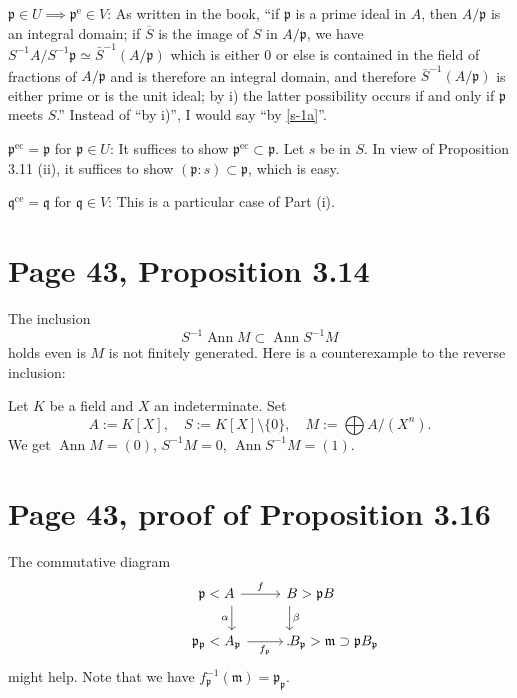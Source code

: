 \documentclass[12pt]{article}
\newcommand{\oo}{\operatorname}
\newcommand{\mf}{\mathfrak}
\newcommand{\ppp}{\mf p}
\begin{document}
$\mf p\in U\implies\mf p^{\oo e}\in V$: As written in the book, ``if $\mf p$ is a prime ideal in $A$, then $A/\mf p$ is an integral domain; if $\overline S$ is the image of $S$ in $A/\mf p$, we have $S^{-1}A/S^{-1}\mf p\simeq\bar S^{-1}(A/\mf p)$ which is either $0$ or else is contained in the field of fractions of $A/\mf p$ and is therefore an integral domain, and therefore $\bar S^{-1}(A/\mf p)$ is either prime or is the unit ideal; by i) the latter possibility occurs if and only if $\mf p$ meets $S$.'' Instead of ``by i)'', I would say ``by \eqref{s-1a}''.

$\mf p^{\oo{ec}}=\mf p$ for $\mf p\in U$: It suffices to show $\mf p^{\oo{ec}}\subset\mf p$. Let $s$ be in $S$. In view of Proposition 3.11 (ii), it suffices to show $(\mf p:s)\subset\mf p$, which is easy.

$\mf q^{\oo{ce}}=\mf q$ for $\mf q\in V$: This is a particular case of Part (i).

\section{Page 43, Proposition 3.14}%

The inclusion 
$$
S^{-1}\oo{Ann}M\subset\oo{Ann}S^{-1}M
$$ 
holds even is $M$ is not finitely generated. Here is a counterexample to the reverse inclusion:

Let $K$ be a field and $X$ an indeterminate. Set 
$$
A:=K[X],\quad S:=K[X]\setminus\{0\},\quad M:=\bigoplus A/(X^n).
$$ 
We get $\oo{Ann}M=(0)$, $S^{-1}M=0$, $\oo{Ann}S^{-1}M=(1)$. 

\section{Page 43, proof of Proposition 3.16}%

The commutative diagram
$$
\begin{tikzcd}
\kern-22pt\ppp<A\ar[d,"\alpha"']\ar[r,"f"]&B>\ppp B\ar[d,"\beta"]\kern-30pt\\ 
\kern-22pt\ppp_\ppp<A_\ppp\ar[r,"f_\ppp"']&B_\ppp>\mf m\supset\ppp B_\ppp\kern-66pt.
\end{tikzcd}
$$ 
might help. Note that we have $f_\ppp^{-1}(\mf m)=\ppp_\ppp$.
\end{document}
